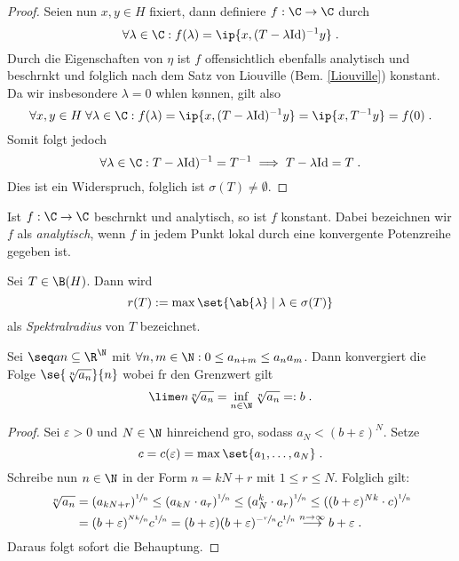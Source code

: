 \begin{proof}
		Seien nun \(x,y\in H\) fixiert, dann definiere \(f:\C \to \C\) durch 
		\[\forall \lambda \in \C: f(\lambda) = \ip{x, (T-\lambda \text{Id})^{-1}y}\;.\]
		Durch die Eigenschaften von $\eta$ ist $f$ offensichtlich ebenfalls analytisch und beschr\as nkt und folglich nach dem Satz von Liouville (Bem. \ref{Liouville}) konstant. Da wir insbesondere \(\lambda = 0\) w\as hlen k\o nnen, gilt also 
		\[\forall x, y\in H\;\forall \lambda \in \C: f(\lambda) = \ip{x, (T-\lambda \text{Id})^{-1}y} = \ip {x, T^{-1}y} = f(0)\;.\]
		Somit folgt jedoch 
		\[\forall \lambda \in \C: T-\lambda \text{Id})^{-1} = T^{-1} \implies T - \lambda\text{Id} = T\;.\]
		Dies ist ein Widerspruch, folglich ist \(\sigma(T) \neq \emptyset\).
	\end{proof}
	\begin{rem} \label{Liouville}
		Ist \(f:\C \to \C\) beschr\as nkt und analytisch, so ist $f$ konstant. Dabei bezeichnen wir $f$ als \textit{analytisch}, wenn $f$ in jedem Punkt lokal durch eine konvergente Potenzreihe gegeben ist.
	\end{rem}
	
	\begin{definition}
		Sei \(T\in \B(H)\). Dann wird 
		\[r(T) := \max\set{\ab{\lambda}\;\vert\; \lambda \in \sigma(T)}\]
		als \textit{Spektralradius} von $T$ bezeichnet. 
	\end{definition}
	
	\begin{lemma}
		\label{Lemma_Spektralradius}
		Sei \(\seq an \subseteq \R^\N\) mit \(\forall n,m\in\N: 0 \leq a_{n+m} \leq a_n a_m\). Dann konvergiert die Folge \(\se{\sqrt[n]{a_n}}{n}\) wobei f\us r den Grenzwert gilt
		\[\lime n \sqrt[n]{a_n} = \inf_{n\in\N} \sqrt[n]{a_n}=: b\;.\]
	\end{lemma}
	\begin{proof}
		Sei \(\varepsilon > 0\) und \(N\in\N\) hinreichend gro\s{}, sodass \(a_N < (b+\varepsilon)^N\). Setze
		\[c = c(\varepsilon) = \max\set{a_1,\ldots, a_N}\;.\]
		Schreibe nun \(n\in \N\) in der Form \(n = kN + r\) mit \(1\leq r \leq N\). Folglich gilt:
		\begin{align*}
			\sqrt[n]{a_n} &= (a_{kN+r})^{\sfrac 1n} \leq (a_{kN} \cdot a_r)^{\sfrac 1n} \leq (a_{N}^k \cdot a_r)^{\sfrac 1n} \leq ((b+\varepsilon)^{Nk} \cdot c)^{\sfrac 1n}\\
			&= (b + \varepsilon)^{\sfrac{Nk}{n}} c^{\sfrac 1n} = (b+\varepsilon)(b+\varepsilon)^{-\sfrac rn}c ^{\sfrac 1n} \overset{n\to\infty}{\longrightarrow} b + \varepsilon\;.
		\end{align*}
		Daraus folgt sofort die Behauptung.
	\end{proof}
	
